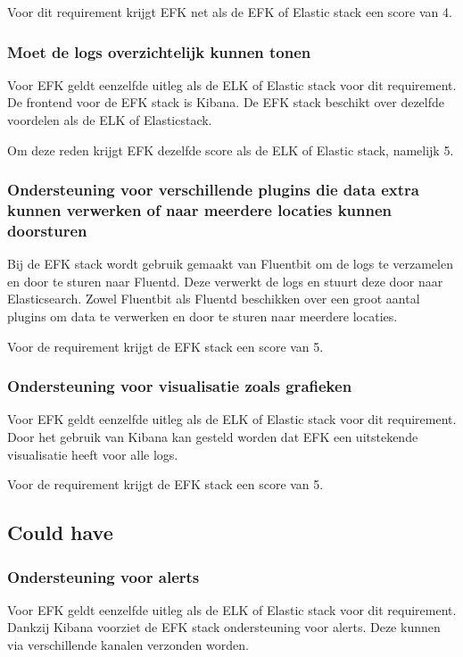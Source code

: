 Voor dit requirement krijgt EFK net als de EFK of Elastic stack een score van 4.

\subsubsection{Moet de logs overzichtelijk kunnen tonen}
Voor EFK geldt eenzelfde uitleg als de ELK of Elastic stack voor dit requirement. De frontend voor de EFK stack is Kibana. De EFK stack beschikt over dezelfde voordelen als de ELK of Elasticstack.

Om deze reden krijgt EFK dezelfde score als de ELK of Elastic stack, namelijk 5.

\subsubsection{Ondersteuning voor verschillende plugins die data extra kunnen verwerken of naar meerdere locaties kunnen doorsturen}
Bij de EFK stack wordt gebruik gemaakt van Fluentbit om de logs te verzamelen en door te sturen naar Fluentd. Deze verwerkt de logs en stuurt deze door naar Elasticsearch. Zowel Fluentbit als Fluentd beschikken over een groot aantal plugins om data te verwerken en door te sturen naar meerdere locaties.

Voor de requirement krijgt de EFK stack een score van 5.

\subsubsection{Ondersteuning voor visualisatie zoals grafieken}
Voor EFK geldt eenzelfde uitleg als de ELK of Elastic stack voor dit requirement. Door het gebruik van Kibana kan gesteld worden dat EFK een uitstekende visualisatie heeft voor alle logs.

Voor de requirement krijgt de EFK stack een score van 5.

\subsection{Could have}
\subsubsection{Ondersteuning voor alerts}
Voor EFK geldt eenzelfde uitleg als de ELK of Elastic stack voor dit requirement. Dankzij Kibana voorziet de EFK stack ondersteuning voor alerts. Deze kunnen via verschillende kanalen verzonden worden.

